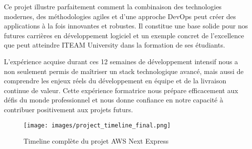 Ce projet illustre parfaitement comment la combinaison des technologies modernes, des méthodologies agiles et d'une approche DevOps peut créer des applications à la fois innovantes et robustes. Il constitue une base solide pour nos futures carrières en développement logiciel et un exemple concret de l'excellence que peut atteindre ITEAM University dans la formation de ses étudiants.

L'expérience acquise durant ces 12 semaines de développement intensif nous a non seulement permis de maîtriser un stack technologique avancé, mais aussi de comprendre les enjeux réels du développement en équipe et de la livraison continue de valeur. Cette expérience formatrice nous prépare efficacement aux défis du monde professionnel et nous donne confiance en notre capacité à contribuer positivement aux projets futurs.

\begin{figure}[H]
    \centering
    \texttt{[image: images/project\_timeline\_final.png]}
    \caption{Timeline complète du projet AWS Next Express}
    \label{fig:project_timeline_final}
\end{figure} 